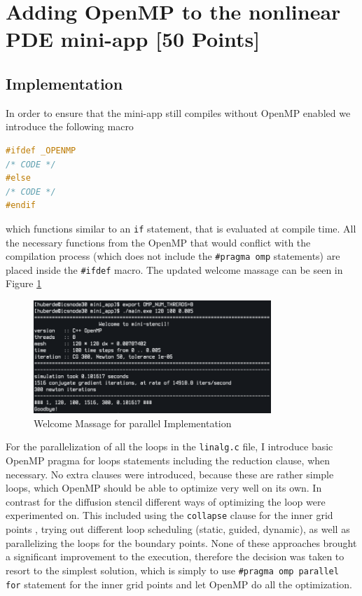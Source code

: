 \section{Adding OpenMP to the nonlinear PDE mini-app [50 Points]}

\subsection{Implementation}
In order to ensure that the mini-app still compiles without OpenMP enabled we introduce the following macro
\begin{lstlisting}[language=C++, caption=\_OpenMP macro, label=lst:omp-macro]
#ifdef _OPENMP
/* CODE */
#else
/* CODE */
#endif
\end{lstlisting}
which functions similar to an \texttt{if} statement, that is evaluated at compile time.
All the necessary functions from the OpenMP that would conflict with the compilation process (which does not include the \texttt{\#pragma omp} statements) are placed inside the \texttt{\#ifdef} macro. \cite{noauthor_conditional_nodate}
The updated welcome massage can be seen in Figure \ref{fig:welcome}
\begin{figure}[H]
	\centering
	\includegraphics[width=0.8\textwidth]{../media/welcome_parallel.png}
	\caption{Welcome Massage for parallel Implementation}
	\label{fig:welcome}
\end{figure}
For the parallelization of all the loops in the \texttt{linalg.c} file, I introduce basic OpenMP pragma for loops statements including the reduction clause, when necessary. No extra clauses were introduced, because these are rather simple loops, which OpenMP should be able to optimize very well on its own.\newline
\newline
In contrast for the diffusion stencil different ways of optimizing the loop were experimented on. This included using the \texttt{collapse} clause for the inner grid points \cite{noauthor_collapse_nodate}, trying out different loop scheduling (static, guided, dynamic), as well as parallelizing the loops for the boundary points. None of these approaches brought a significant improvement to the execution, therefore the decision was taken to resort to the simplest solution, which is simply to use \texttt{\#pragma omp parallel for} statement for the inner grid points and let OpenMP do all the optimization.


